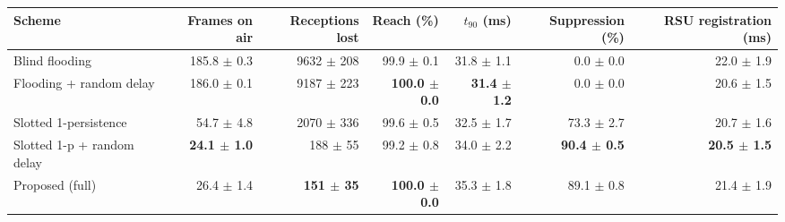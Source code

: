 \footnotesize
\renewcommand{\arraystretch}{1.2}
\begin{tabular}{lrrrrrr}
\toprule
Scheme & Frames on air & Receptions lost & Reach (\%) & $t_{90}$ (ms) & Suppression (\%) & RSU registration (ms) \\
\midrule
Blind flooding & 185.8 $\pm$ 0.3 & 9632 $\pm$ 208 & 99.9 $\pm$ 0.1 & 31.8 $\pm$ 1.1 & 0.0 $\pm$ 0.0 & 22.0 $\pm$ 1.9 \\
Flooding + random delay & 186.0 $\pm$ 0.1 & 9187 $\pm$ 223 & \textbf{100.0 $\pm$ 0.0} & \textbf{31.4 $\pm$ 1.2} & 0.0 $\pm$ 0.0 & 20.6 $\pm$ 1.5 \\
Slotted 1-persistence & 54.7 $\pm$ 4.8 & 2070 $\pm$ 336 & 99.6 $\pm$ 0.5 & 32.5 $\pm$ 1.7 & 73.3 $\pm$ 2.7 & 20.7 $\pm$ 1.6 \\
Slotted 1-p + random delay & \textbf{24.1 $\pm$ 1.0} & 188 $\pm$ 55 & 99.2 $\pm$ 0.8 & 34.0 $\pm$ 2.2 & \textbf{90.4 $\pm$ 0.5} & \textbf{20.5 $\pm$ 1.5} \\
Proposed (full) & 26.4 $\pm$ 1.4 & \textbf{151 $\pm$ 35} & \textbf{100.0 $\pm$ 0.0} & 35.3 $\pm$ 1.8 & 89.1 $\pm$ 0.8 & 21.4 $\pm$ 1.9 \\
\bottomrule
\end{tabular}
